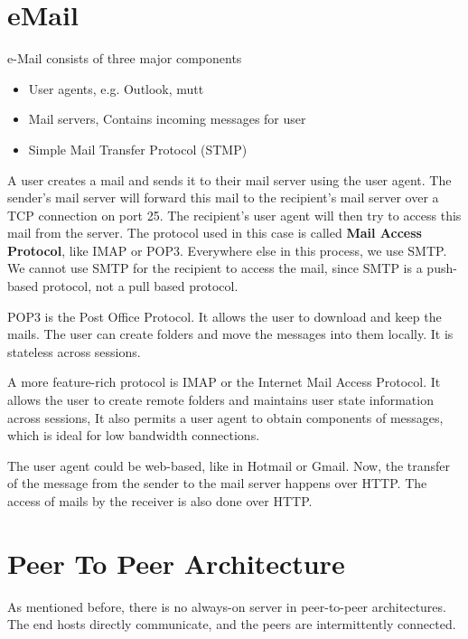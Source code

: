 \documentclass[12pt,letterpaper]{amsbook}
\theoremstyle{definition}
\begin{document}
\section{eMail}

e-Mail consists of three major components

\begin{itemize}
  \item User agents, e.g. Outlook, mutt
  \item Mail servers, Contains incoming messages for user
  \item Simple Mail Transfer Protocol (STMP)
\end{itemize}

A user creates a mail and sends it to their mail server using the user agent. The sender's mail server will forward this mail to the recipient's mail server over a TCP connection on port 25. The recipient's user agent will then try to access this mail from the server. The protocol used in this case is called \textbf{Mail Access Protocol}, like IMAP or POP3. Everywhere else in this process, we use SMTP. We cannot use SMTP for the recipient to access the mail, since SMTP is a push-based protocol, not a pull based protocol.

POP3 is the Post Office Protocol. It allows the user to download and keep the mails. The user can create folders and move the messages into them locally. It is stateless across sessions.

A more feature-rich protocol is IMAP or the Internet Mail Access Protocol. It allows the user to create remote folders and maintains user state information across sessions, It also permits a user agent to obtain components of messages, which is ideal for low bandwidth connections.

The user agent could be web-based, like in Hotmail or Gmail. Now, the transfer of the message from the sender to the mail server happens over HTTP. The access of mails by the receiver is also done over HTTP.

\section{Peer To Peer Architecture}

As mentioned before, there is no always-on server in peer-to-peer architectures. The end hosts directly communicate, and the peers are intermittently connected.
\end{document}
